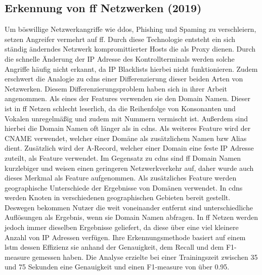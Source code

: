 \documentclass[
    12pt, %
    DIV10,
    ngerman, %
    a4paper, %
    oneside, %
    titlepage, %
    parskip=half, %
    headings=normal, %
    listof=totoc, %
    bibliography=totoc, %
    index=totoc, %
    captions=tableheading, %
    final %
]{scrreprt}
\begin{document}
\subsection{Erkennung von \acs{ff} Netzwerken (2019)}
Um böswillige Netzwerkangriffe wie \ac{ddos}, Phishing und Spaming zu verschleiern, setzen Angreifer vermehrt auf \ac{ff}. Durch diese Technologie entsteht ein sich ständig änderndes Netzwerk kompromittierter Hosts die als Proxy dienen. Durch die schnelle Änderung der IP Adresse des Kontrollterminals werden solche Angriffe häufig nicht erkannt, da IP Blacklists hierbei nicht funktionieren. Zudem erschwert die Analogie zu \ac{cdns} einer Differenzierung dieser beiden Arten von Netzwerken.
Diesem Differenzierungsproblem haben sich \textcite{Chen2019} in ihrer Arbeit angenommen. Als eines der Features verwenden sie den Domain Namen. Dieser ist in \ac{ff} Netzen schlecht leserlich, da die Reihenfolge von Konsonanten und Vokalen unregelmäßig und zudem mit Nummern vermischt ist. Außerdem sind hierbei die Domain Namen oft länger als in \ac{cdns}. Als weiteres Feature wird der CNAME verwendet, welcher einer Domäne als zusätzlichem Namen bzw Alias dient. Zusätzlich wird der A-Record, welcher einer Domain eine feste IP Adresse zuteilt, als Feature verwendet. Im Gegensatz zu \ac{cdns} sind \ac{ff} Domain Namen kurzlebiger und weisen einen geringeren Netzwerkverkehr auf, daher wurde auch dieses Merkmal als Feature aufgenommen. Als zusätzliches Feature werden geographische Unterschiede der Ergebnisse von Domänen verwendet. In \ac{cdns} werden Knoten in verschiedenen geographischen Gebieten bereit gestellt. Deswegen bekommen Nutzer die weit voneinander entfernt sind unterschiedliche Auflösungen als Ergebnis, wenn sie Domain Namen abfragen. In \ac{ff} Netzen werden jedoch immer dieselben Ergebnisse geliefert, da diese über eine viel kleinere Anzahl von IP Adressen verfügen. Ihre Erkennungsmethode basiert auf einem \ac{lstm} dessen Effizienz sie anhand der Genauigkeit, dem Recall und dem F1-measure gemessen haben. Die Analyse erzielte bei einer Trainingszeit zwischen 35 und 75 Sekunden eine Genauigkeit und einen F1-measure von über 0.95.
%
\end{document}
